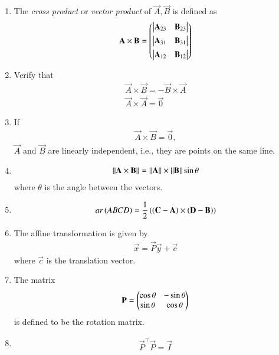 \begin{enumerate}[label=\thesubsection.\arabic*.,ref=\thesubsection.\theenumi]
\item The {\em cross product} or {\em vector product} of $\vec{A}, \vec{B}$ is defined as
\begin{align}
  \label{eq:cross3d}
	\mathbf{A} \times \mathbf{B} 
	 = \begin{pmatrix} \begin{vmatrix}\mathbf{A}_{23} & \mathbf{B}_{23}\end{vmatrix} \\[1ex] \begin{vmatrix}\mathbf{A}_{31} & \mathbf{B}_{31}\end{vmatrix} \\[1ex] \begin{vmatrix}\mathbf{A}_{12}  & \mathbf{B}_{12}\end{vmatrix}\end{pmatrix}
\end{align}
\item Verify that
\begin{align}
  \label{eq:cross3d-commute}
  \vec{A} \times \vec{B} = -  \vec{B} \times \vec{A} 
  \\
  \label{eq:cross3d-same}
  \vec{A} \times \vec{A} = \vec{0}
\end{align}
\item If 
		\label{prop:lin-dep-cross}
\begin{align}
  \vec{A} \times \vec{B} = \vec{0},
\end{align}
  $\vec{A}$ and $ \vec{B} $ are linearly independent, i.e., they are points on the same line.
  \item 
\begin{align}
	\label{eq:cross-sin}
	\left\lVert \mathbf{A} \times \mathbf{B} \right\rVert
	=
	\left\lVert\mathbf{A}\right\rVert \times 	\left\lVert\mathbf{B}\right\rVert \sin \theta
\end{align}
where $\theta$ is the angle between the vectors.
\item 
\begin{align}
	ar\left(ABCD\right) = 
         \frac{1}{2}\left(\left(\mathbf{C}-\mathbf{A}\right)\times\left(\mathbf{D}-\mathbf{B}\right)\right) \\
        \label{eq:11/10/1/1area-diag} 
\end{align}
	\item 
The affine transformation is given by 
\begin{align}
	\label{eq:conic_affine}
	\vec{x} = \vec{P}\vec{y}+\vec{c}
\end{align}
where $\vec{c}$ is the translation vector.
\item The matrix
\begin{align}
\mathbf{P} =
\begin{pmatrix}
\cos\theta & -\sin\theta \\
\sin\theta & \cos\theta 
\end{pmatrix}
\end{align}
is defined to be the rotation matrix. 
\item 
\begin{align}
	\vec{P}^{\top} \vec{P} = \vec{I}
\end{align}

\end{enumerate}

